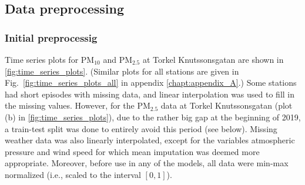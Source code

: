 
\subsection{Data preprocessing}
\subsubsection{Initial preprocessig}
Time series plots for PM$_{10}$ and PM$_{2.5}$ at Torkel Knutssonsgatan are shown in \vref{fig:time_series_plots}. (Similar plots for all stations are given in Fig.\ \ref{fig:time_series_plots_all} in appendix \ref{chapt:appendix_A}.)
Some stations had short episodes with missing data, and linear interpolation was used to fill in the missing values. However, for the PM$_{2.5}$ data at Torkel Knutssonsgatan (plot (b) in \vref{fig:time_series_plots}), due to the rather big gap at the beginning of 2019, a train-test split was done to entirely avoid this period (see below). Missing weather data was also linearly interpolated, except for the variables atmospheric pressure and wind speed for which mean imputation was deemed more appropriate. Moreover, before use in any of the models, all data were min-max normalized (i.e., scaled to the interval $[0,1]$). 

